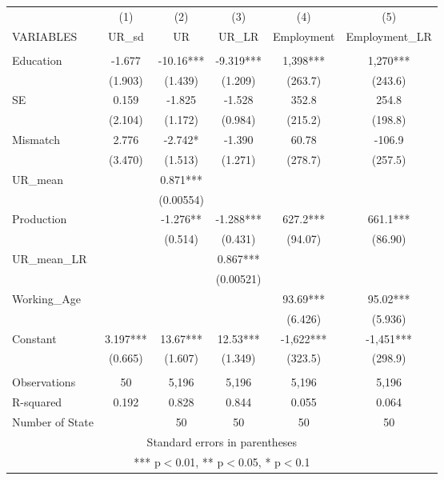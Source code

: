 \documentclass[]{article}
\begin{document}
\begin{tabular}{lccccc} \hline
 & (1) & (2) & (3) & (4) & (5) \\
VARIABLES & UR\_sd & UR & UR\_LR & Employment & Employment\_LR \\ \hline
 &  &  &  &  &  \\
Education & -1.677 & -10.16*** & -9.319*** & 1,398*** & 1,270*** \\
 & (1.903) & (1.439) & (1.209) & (263.7) & (243.6) \\
SE & 0.159 & -1.825 & -1.528 & 352.8 & 254.8 \\
 & (2.104) & (1.172) & (0.984) & (215.2) & (198.8) \\
Mismatch & 2.776 & -2.742* & -1.390 & 60.78 & -106.9 \\
 & (3.470) & (1.513) & (1.271) & (278.7) & (257.5) \\
UR\_mean &  & 0.871*** &  &  &  \\
 &  & (0.00554) &  &  &  \\
Production &  & -1.276** & -1.288*** & 627.2*** & 661.1*** \\
 &  & (0.514) & (0.431) & (94.07) & (86.90) \\
UR\_mean\_LR &  &  & 0.867*** &  &  \\
 &  &  & (0.00521) &  &  \\
Working\_Age &  &  &  & 93.69*** & 95.02*** \\
 &  &  &  & (6.426) & (5.936) \\
Constant & 3.197*** & 13.67*** & 12.53*** & -1,622*** & -1,451*** \\
 & (0.665) & (1.607) & (1.349) & (323.5) & (298.9) \\
 &  &  &  &  &  \\
Observations & 50 & 5,196 & 5,196 & 5,196 & 5,196 \\
R-squared & 0.192 & 0.828 & 0.844 & 0.055 & 0.064 \\
 Number of State &  & 50 & 50 & 50 & 50 \\ \hline
\multicolumn{6}{c}{ Standard errors in parentheses} \\
\multicolumn{6}{c}{ *** p$<$0.01, ** p$<$0.05, * p$<$0.1} \\
\end{tabular}
\end{document}
